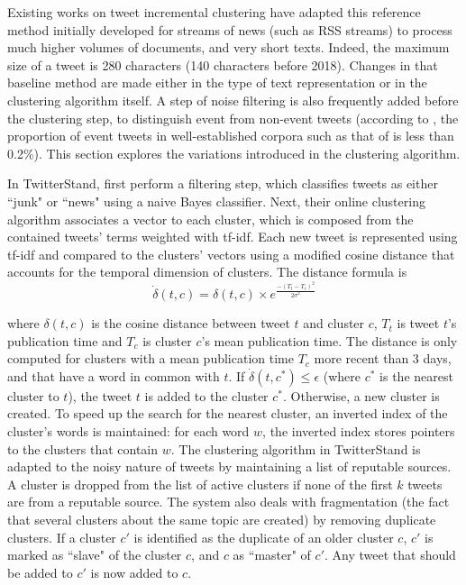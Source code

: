Existing works on tweet incremental clustering have adapted this reference method initially developed for streams of news (such as RSS streams) to process much higher volumes of documents, and very short texts. Indeed, the maximum size of a tweet is 280 characters (140 characters before 2018). Changes in that baseline method are made either in the type of text representation or in the clustering algorithm itself. A step of noise filtering is also frequently added before the clustering step, to distinguish event from non-event tweets (according to \citet{liu_reuters_2016}, the proportion of event tweets in well-established corpora such as that of \citet{mcminn_building_2013} is less than 0.2\%). This section explores the variations introduced in the clustering algorithm.


In TwitterStand, \citet{sankaranarayanan_twitterstand:_2009} first perform a filtering step, which classifies tweets as either ``junk" or ``news" using a naive Bayes classifier. Next, their online clustering algorithm associates a vector to each cluster, which is composed from the contained tweets' terms weighted with tf-idf. Each new tweet is represented using tf-idf and compared to the clusters' vectors using a modified cosine distance that accounts for the temporal dimension of clusters. The distance formula is 
$$
\dot{\delta}(t,c) = \delta(t,c)\times e^{\frac{-(T_t-T_c)^2}{2\sigma^2}}
$$

\noindent where $\delta(t,c)$ is the cosine distance between tweet $t$ and cluster $c$, $T_t$ is tweet $t$'s publication time and $T_c$ is cluster $c$'s mean publication time. The distance is only computed for clusters with a mean publication time $T_c$ more recent than 3 days, and that have a word in common with $t$. If $\dot{\delta}(t,c^*) \leqslant \epsilon$ (where $c^*$ is the nearest cluster to $t$), the tweet $t$ is added to the cluster $c^*$. Otherwise, a new cluster is created. To speed up the search for the nearest cluster, an inverted index of the cluster's words is maintained: for each word $w$, the inverted index stores pointers to the clusters that contain $w$. The clustering algorithm in TwitterStand is adapted to the noisy nature of tweets by maintaining a list of reputable sources. A cluster is dropped from the list of active clusters if none of the first $k$ tweets are from a reputable source. The system also deals with fragmentation (the fact that several clusters about the same topic are created) by removing duplicate clusters. If a cluster $c'$  is identified as the duplicate of an older cluster $c$, $c'$ is marked as ``slave" of the cluster $c$, and $c$ as ``master" of $c'$. Any tweet that should be added to $c'$ is now added to $c$.

